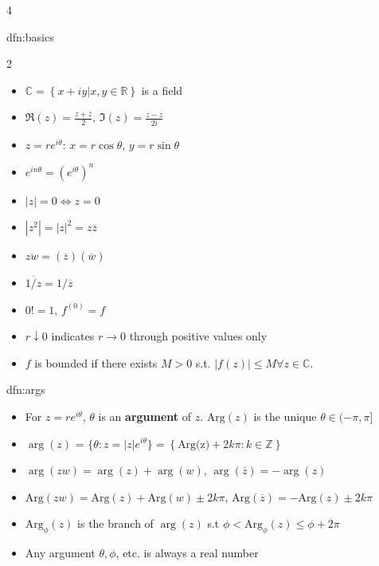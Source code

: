 \documentclass[landscape, 8pt]{extarticle}
\begin{document}
\begin{multicols*}{4}
		
		\begin{dfn}[Basics]{dfn:basics}{ }
			\vspace{-5pt}
			\begin{multicols}{2}
				\begin{itemize}
					\item $\mathbb{C} = \left\{x + iy | x, y \in \mathbb{R}\right\}$ is a field
					\item $\Re(z) = \frac{z + \overline{z}}{2}$, $\Im(z) = \frac{z - \overline{z}}{2 i}$
					\item $z = re^{i\theta}$: $x = r \cos\theta$, $y = r \sin\theta$
					\item $e^{in \theta} = (e^{i \theta})^n$
					\item $\left|z\right| = 0 \iff z = 0$
					\item $\left|z^2\right| = \left|z\right|^2 = z \overline{z}$
					\item $\overline{zw} = (\overline{z}) (\overline{w})$
					\item $\overline{1/z} = 1/\overline{z}$
					\item $0! = 1$, $f^{(0)} = f$
					\item $r \downarrow 0$ indicates $r \to 0$ through positive values only
				\end{itemize}
				
			\end{multicols}
			\vspace{-11pt}
			\begin{itemize}
				\item $f$ is bounded if there exists $M > 0$ s.t. $\left|f(z)\right| \le M \forall z \in \mathbb{C}$.
			\end{itemize}
		
		\end{dfn}
		
		
		\begin{dfn}{dfn:args}{ }
			\begin{itemize}
				\item For $z = re^{i\theta}$, $\theta$ is an \textbf{argument} of $z$. $\text{Arg}(z)$ is the unique $\theta \in (-\pi, \pi]$
				\item $\arg(z)$ = $\{\theta : z = \left|z\right| e^{i\theta}\} = \left\{ \text{Arg(z)} + 2k\pi : k \in \mathbb{Z}\right\}$
				\item $\arg(zw)  = \arg(z) + \arg(w)$, $\arg(\overline{z}) = -\arg(z)$
				\item $\text{Arg}(zw) = \text{Arg}(z) + \text{Arg}(w) \pm 2k \pi$, $\text{Arg}(\overline{z}) = -\text{Arg}(z) \pm 2k \pi$
				\item $\text{Arg}_\phi(z)$ is the branch of $\arg(z)$ s.t $\phi < \text{Arg}_\phi(z) \le \phi + 2\pi$
				\item Any argument $\theta, \phi$, etc. is always a real number
			\end{itemize}
			

\end{dfn}
\end{multicols*}
\end{document}
